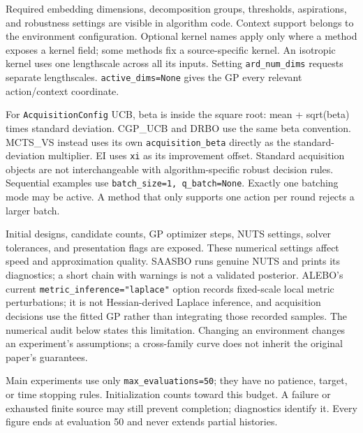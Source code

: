 \documentclass[10pt,a4paper]{article}
\begin{document}
Required embedding dimensions,\allowbreak{} decomposition groups,\allowbreak{} thresholds,\allowbreak{} aspirations,\allowbreak{} and robustness settings are visible in algorithm code. Context support belongs to the environment configuration. Optional kernel names apply only where a method exposes a kernel field; some methods fix a source-specific kernel. An isotropic kernel uses one lengthscale across all its inputs. Setting \texttt{ard\_\allowbreak{}num\_\allowbreak{}dims} requests separate lengthscales. \texttt{active\_\allowbreak{}dims=\allowbreak{}None} gives the GP every relevant action/context coordinate.


For \texttt{Acquisition\allowbreak{}Config} UCB,\allowbreak{} beta is inside the square root: mean + sqrt(beta) times standard deviation. CGP\_\allowbreak{}UCB and DRBO use the same beta convention. MCTS\_\allowbreak{}VS instead uses its own \texttt{acquisition\_\allowbreak{}beta} directly as the standard- deviation multiplier. EI uses \texttt{xi} as its improvement offset. Standard acquisition objects are not interchangeable with algorithm-specific robust decision rules. Sequential examples use \texttt{batch\_\allowbreak{}size=\allowbreak{}1,\allowbreak{} q\_\allowbreak{}batch=\allowbreak{}None}. Exactly one batching mode may be active. A method that only supports one action per round rejects a larger batch.


Initial designs,\allowbreak{} candidate counts,\allowbreak{} GP optimizer steps,\allowbreak{} NUTS settings,\allowbreak{} solver tolerances,\allowbreak{} and presentation flags are exposed. These numerical settings affect speed and approximation quality. SAASBO runs genuine NUTS and prints its diagnostics; a short chain with warnings is not a validated posterior. ALEBO's current \texttt{metric\_\allowbreak{}inference=\allowbreak{}"laplace"} option records fixed-scale local metric perturbations; it is not Hessian-derived Laplace inference,\allowbreak{} and acquisition decisions use the fitted GP rather than integrating those recorded samples. The numerical audit below states this limitation. Changing an environment changes an experiment's assumptions; a cross-family curve does not inherit the original paper's guarantees.


Main experiments use only \texttt{max\_\allowbreak{}evaluations=\allowbreak{}50}; they have no patience,\allowbreak{} target,\allowbreak{} or time stopping rules. Initialization counts toward this budget. A failure or exhausted finite source may still prevent completion; diagnostics identify it. Every figure ends at evaluation 50 and never extends partial histories.
\end{document}
